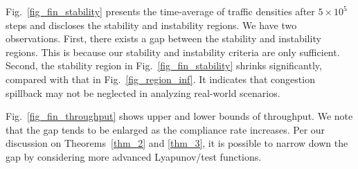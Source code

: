 Fig.~\ref{fig_fin_stability} presents the time-average of traffic densities after $5\times10^5$ steps and discloses the stability and instability regions. We have two observations. First, there exists a gap between the stability and instability regions. This is because our stability and instability criteria are only sufficient. Second, the stability region in Fig.~\ref{fig_fin_stability} shrinks significantly, compared with that in Fig.~\ref{fig_region_inf}. It indicates that congestion spillback may not be neglected in analyzing real-world scenarios.

Fig.~\ref{fig_fin_throughput} shows upper and lower bounds of throughput. We note that the gap tends to be enlarged as the compliance rate increases. Per our discussion on Theorems~\ref{thm_2} and \ref{thm_3}, it is possible to narrow down the gap by considering more advanced Lyapunov/test functions.



